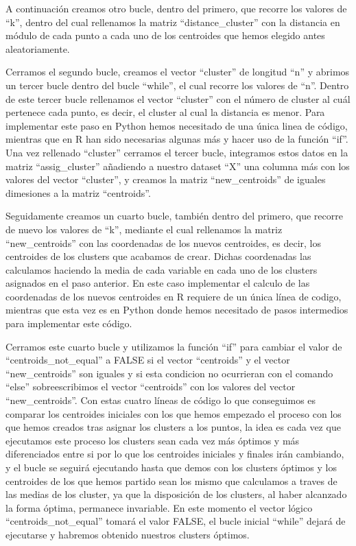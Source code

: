 \documentclass[
]{article}
\begin{document}
A continuación creamos otro bucle, dentro del primero, que recorre los
valores de ``k'', dentro del cual rellenamos la matriz
``distance\_cluster'' con la distancia en módulo de cada punto a cada
uno de los centroides que hemos elegido antes aleatoriamente.

Cerramos el segundo bucle, creamos el vector ``cluster'' de longitud
``n'' y abrimos un tercer bucle dentro del bucle ``while'', el cual
recorre los valores de ``n''. Dentro de este tercer bucle rellenamos el
vector ``cluster'' con el número de cluster al cuál pertenece cada
punto, es decir, el cluster al cual la distancia es menor. Para
implementar este paso en Python hemos necesitado de una única linea de
código, mientras que en R han sido necesarias algunas más y hacer uso de
la función ``if''. Una vez rellenado ``cluster'' cerramos el tercer
bucle, integramos estos datos en la matriz ``assig\_cluster'' añadiendo
a nuestro dataset ``X'' una columna más con los valores del vector
``cluster'', y creamos la matriz ``new\_centroids'' de iguales
dimesiones a la matriz ``centroids''.

Seguidamente creamos un cuarto bucle, también dentro del primero, que
recorre de nuevo los valores de ``k'', mediante el cual rellenamos la
matriz ``new\_centroids'' con las coordenadas de los nuevos centroides,
es decir, los centroides de los clusters que acabamos de crear. Dichas
coordenadas las calculamos haciendo la media de cada variable en cada
uno de los clusters asignados en el paso anterior. En este caso
implementar el calculo de las coordenadas de los nuevos centroides en R
requiere de un única línea de codigo, mientras que esta vez es en Python
donde hemos necesitado de pasos intermedios para implementar este
código.

Cerramos este cuarto bucle y utilizamos la función ``if'' para cambiar
el valor de ``centroids\_not\_equal'' a FALSE si el vector ``centroids''
y el vector ``new\_centroids'' son iguales y si esta condicion no
ocurrieran con el comando ``else'' sobreescribimos el vector
``centroids'' con los valores del vector ``new\_centroids''. Con estas
cuatro líneas de código lo que conseguimos es comparar los centroides
iniciales con los que hemos empezado el proceso con los que hemos
creados tras asignar los clusters a los puntos, la idea es cada vez que
ejecutamos este proceso los clusters sean cada vez más óptimos y más
diferenciados entre si por lo que los centroides iniciales y finales
irán cambiando, y el bucle se seguirá ejecutando hasta que demos con los
clusters óptimos y los centroides de los que hemos partido sean los
mismo que calculamos a traves de las medias de los cluster, ya que la
disposición de los clusters, al haber alcanzado la forma óptima,
permanece invariable. En este momento el vector lógico
``centroids\_not\_equal'' tomará el valor FALSE, el bucle inicial
``while'' dejará de ejecutarse y habremos obtenido nuestros clusters
óptimos.
\end{document}
